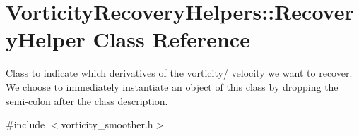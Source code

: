 \hypertarget{classVorticityRecoveryHelpers_1_1RecoveryHelper}{}\section{Vorticity\+Recovery\+Helpers\+:\+:Recovery\+Helper Class Reference}
\label{classVorticityRecoveryHelpers_1_1RecoveryHelper}


Class to indicate which derivatives of the vorticity/ velocity we want to recover. We choose to immediately instantiate an object of this class by dropping the semi-\/colon after the class description.  




{\ttfamily \#include $<$vorticity\+\_\+smoother.\+h$>$}

